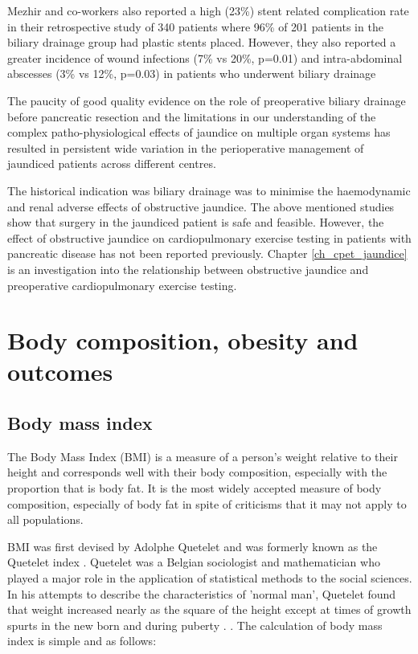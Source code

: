 Mezhir and co-workers also reported a high (23\%) stent related complication rate in their retrospective study of 340 patients where 96\% of 201 patients in the biliary drainage group had plastic stents placed. 
However, they also reported a greater incidence of wound infections (7\% vs 20\%, p=0.01) and intra-abdominal abscesses (3\% vs 12\%, p=0.03) in patients who underwent biliary drainage \parencite{mezhir_matched_2009}

The paucity of good quality evidence on the role of preoperative biliary drainage before pancreatic resection \parencite{wang_preoperative_2008} and the limitations in our understanding of the complex patho-physiological effects of jaundice on multiple organ systems has resulted in persistent wide variation in the perioperative management of jaundiced patients across different centres.

The historical indication was biliary drainage was to minimise the haemodynamic and renal adverse effects of obstructive jaundice. 
The above mentioned studies show that surgery in the jaundiced patient is safe and feasible. 
However, the effect of obstructive jaundice on cardiopulmonary exercise testing in patients with pancreatic disease has not been reported previously. 
Chapter \ref{ch_cpet_jaundice} is an investigation into the relationship between obstructive jaundice and preoperative cardiopulmonary exercise testing.

\section{Body composition, obesity and outcomes}

\subsection{Body mass index}

The Body Mass Index (BMI) is a measure of a person's weight relative to their height and corresponds well with their body composition, especially with the proportion that is body fat. 
It is the most widely accepted measure of body composition, especially of body fat in spite of criticisms that it may not apply to all populations. 

BMI was first devised by Adolphe Quetelet and was formerly known as the Quetelet index \parencite{eknoyan_adolphe_2008}. 
Quetelet was a Belgian sociologist and mathematician who played a major role in the application of statistical methods to the social sciences. 
In his attempts to describe the characteristics of 'normal man', Quetelet found that weight increased nearly as the square of the height except at times of growth spurts in the new born and during puberty \parencite{quetelet_treatise_1842}. . 
The calculation of body mass index is simple and as follows:

